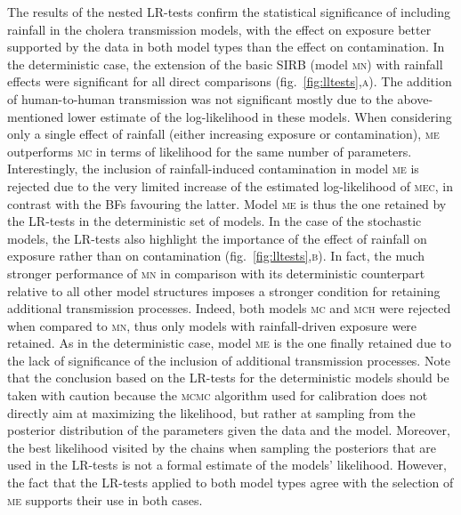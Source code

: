 The results of the nested LR-tests confirm the statistical significance of including rainfall in the cholera transmission models, with the effect on exposure better supported by the data in both model types than the effect on contamination. In the deterministic case, the extension of the basic SIRB (model \textsc{mn}) with rainfall effects were significant for all direct comparisons (fig.~\ref{fig:lltests},\textsc{a}). The addition of human-to-human transmission was not significant mostly due to the above-mentioned lower estimate of the log-likelihood in these models. When considering only a single effect of rainfall (either increasing exposure or contamination), \textsc{me} outperforms \textsc{mc} in terms of likelihood for the same number of parameters. Interestingly, the inclusion of rainfall-induced contamination in model \textsc{me} is rejected due to the very limited increase of the estimated log-likelihood of \textsc{mec}, in contrast with the BFs favouring the latter. Model \textsc{me} is thus the one retained by the LR-tests in the deterministic set of models. In the case of the stochastic models, the LR-tests also highlight the importance of the effect of rainfall on exposure rather than on contamination (fig.~\ref{fig:lltests},\textsc{b}). In fact, the much stronger performance of \textsc{mn} in comparison with its deterministic counterpart relative to all other model structures imposes a stronger condition for retaining additional transmission processes. Indeed, both models \textsc{mc} and \textsc{mch} were rejected when compared to \textsc{mn}, thus only models with rainfall-driven exposure were retained. As in the deterministic case, model \textsc{me} is the one finally retained due to the lack of significance of the inclusion of additional transmission processes. Note that the conclusion based on the LR-tests for the deterministic models should be taken with caution because the \textsc{mcmc} algorithm used for calibration does not directly aim at maximizing the likelihood, but rather at sampling from the posterior distribution of the parameters given the data and the model. Moreover, the best likelihood visited by the chains when sampling the posteriors that are used in the LR-tests is not a formal estimate of the models' likelihood. However, the fact that the LR-tests applied to both model types agree with the selection of \textsc{me} supports their use in both cases.

